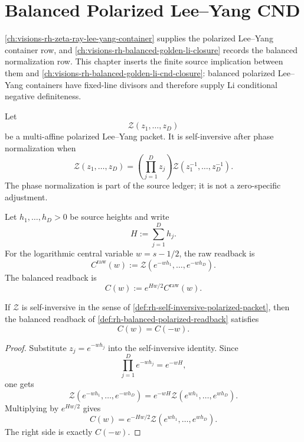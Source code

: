 \chapter{Balanced Polarized Lee--Yang CND}
\label{ch:visions-rh-balanced-polarized-lee-yang-cnd}

\autoref{ch:visions-rh-zeta-ray-lee-yang-container} supplies the
polarized Lee--Yang container row, and
\autoref{ch:visions-rh-balanced-golden-li-closure} records the balanced
normalization row.  This chapter inserts the finite source implication
between them and \autoref{ch:visions-rh-balanced-golden-li-cnd-closure}:
balanced polarized Lee--Yang containers have fixed-line divisors and
therefore supply Li conditional negative definiteness.

\begin{definition}
\label{def:rh-self-inversive-polarized-packet}
Let
$$
\mathcal Z(z_1,\ldots,z_D)
$$
be a multi-affine polarized Lee--Yang packet.  It is self-inversive
after phase normalization when
$$
\mathcal Z(z_1,\ldots,z_D)
=
\left(\prod_{j=1}^{D}z_j\right)
\mathcal Z(z_1^{-1},\ldots,z_D^{-1}).
$$
The phase normalization is part of the source ledger; it is not a
zero-specific adjustment.
\end{definition}

\begin{definition}
\label{def:rh-balanced-polarized-readback}
Let $h_1,\ldots,h_D>0$ be source heights and write
$$
H:=\sum_{j=1}^{D}h_j.
$$
For the logarithmic central variable $w=s-1/2$, the raw readback is
$$
C^{\mathrm{raw}}(w)
:=
\mathcal Z(e^{-wh_1},\ldots,e^{-wh_D}).
$$
The balanced readback is
$$
C(w):=
e^{Hw/2}C^{\mathrm{raw}}(w).
$$
\end{definition}

\begin{theorem}
\label{thm:rh-self-inversive-packets-have-canonical-balance}
If $\mathcal Z$ is self-inversive in the sense of
\autoref{def:rh-self-inversive-polarized-packet}, then the balanced
readback of \autoref{def:rh-balanced-polarized-readback} satisfies
$$
C(w)=C(-w).
$$
\end{theorem}

\begin{proof}
Substitute $z_j=e^{-wh_j}$ into the self-inversive identity.  Since
$$
\prod_{j=1}^{D}e^{-wh_j}=e^{-wH},
$$
one gets
$$
\mathcal Z(e^{-wh_1},\ldots,e^{-wh_D})
=
e^{-wH}
\mathcal Z(e^{wh_1},\ldots,e^{wh_D}).
$$
Multiplying by $e^{Hw/2}$ gives
$$
C(w)
=
e^{-Hw/2}
\mathcal Z(e^{wh_1},\ldots,e^{wh_D}).
$$
The right side is exactly $C(-w)$.
\end{proof}

